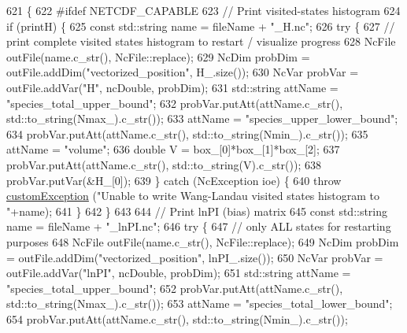 \begin{DoxyCode}
621                                                        \{
622 \textcolor{preprocessor}{#ifdef NETCDF\_CAPABLE}
623 \textcolor{preprocessor}{}    \textcolor{comment}{// Print visited-states histogram}
624     \textcolor{keywordflow}{if} (printH) \{
625         \textcolor{keyword}{const} std::string name = fileName + \textcolor{stringliteral}{"\_H.nc"};
626         \textcolor{keywordflow}{try} \{
627             \textcolor{comment}{// print complete visited states histogram to restart / visualize progress}
628             NcFile outFile(name.c\_str(), NcFile::replace);
629             NcDim probDim = outFile.addDim(\textcolor{stringliteral}{"vectorized\_position"}, H\_.size());
630             NcVar probVar = outFile.addVar(\textcolor{stringliteral}{"H"}, ncDouble, probDim);
631             std::string attName = \textcolor{stringliteral}{"species\_total\_upper\_bound"};
632             probVar.putAtt(attName.c\_str(), std::to\_string(Nmax\_).c\_str());
633             attName = \textcolor{stringliteral}{"species\_upper\_lower\_bound"};
634             probVar.putAtt(attName.c\_str(), std::to\_string(Nmin\_).c\_str());
635             attName = \textcolor{stringliteral}{"volume"};
636             \textcolor{keywordtype}{double} V = box\_[0]*box\_[1]*box\_[2];
637             probVar.putAtt(attName.c\_str(), std::to\_string(V).c\_str());
638             probVar.putVar(&H\_[0]);
639         \} \textcolor{keywordflow}{catch} (NcException ioe) \{
640             \textcolor{keywordflow}{throw} \hyperlink{classcustom_exception}{customException} (\textcolor{stringliteral}{"Unable to write Wang-Landau visited states histogram to 
      "}+name);
641         \}
642     \}
643 
644     \textcolor{comment}{// Print lnPI (bias) matrix}
645     \textcolor{keyword}{const} std::string name = fileName + \textcolor{stringliteral}{"\_lnPI.nc"};
646     \textcolor{keywordflow}{try} \{
647         \textcolor{comment}{// only ALL states for restarting purposes}
648         NcFile outFile(name.c\_str(), NcFile::replace);
649         NcDim probDim = outFile.addDim(\textcolor{stringliteral}{"vectorized\_position"}, lnPI\_.size());
650         NcVar probVar = outFile.addVar(\textcolor{stringliteral}{"lnPI"}, ncDouble, probDim);
651         std::string attName = \textcolor{stringliteral}{"species\_total\_upper\_bound"};
652         probVar.putAtt(attName.c\_str(), std::to\_string(Nmax\_).c\_str());
653         attName = \textcolor{stringliteral}{"species\_total\_lower\_bound"};
654         probVar.putAtt(attName.c\_str(), std::to\_string(Nmin\_).c\_str());

\end{DoxyCode}

